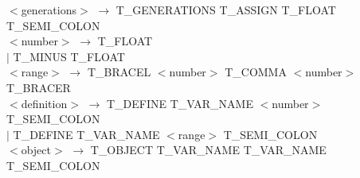 	\noindent
	$<$generations$>$ $\rightarrow$ T\_GENERATIONS T\_ASSIGN T\_FLOAT T\_SEMI\_COLON \\
	\noindent
	$<$number$>$ $\rightarrow$ T\_FLOAT \\
	\hspace{2cm} $|$ T\_MINUS T\_FLOAT \\ 
	
	\noindent
	$<$range$>$ $\rightarrow$ T\_BRACEL $<$number$>$ T\_COMMA $<$number$>$ T\_BRACER\\
	
	\noindent
	$<$definition$>$ $\rightarrow$ T\_DEFINE T\_VAR\_NAME $<$number$>$ T\_SEMI\_COLON \\
	\hspace{2cm} $|$  T\_DEFINE T\_VAR\_NAME $<$range$>$ T\_SEMI\_COLON \\
	
	\noindent
	$<$object$>$ $\rightarrow$ T\_OBJECT T\_VAR\_NAME T\_VAR\_NAME T\_SEMI\_COLON \\
	
